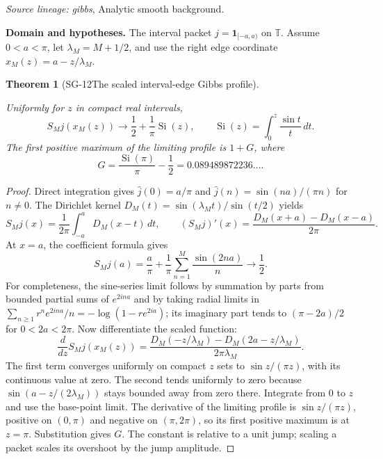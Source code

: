 \documentclass[11pt]{article}
\newtheorem{theorem}{Theorem}[section]
\theoremstyle{definition}\newtheorem{definition}[theorem]{Definition}
\theoremstyle{remark}\newtheorem{remark}[theorem]{Remark}
\begin{document}
\par{\small\color{Teal}\textit{Source lineage:} \textit{gibbs}, Analytic smooth background.}\par

\par{\small\textbf{Domain and hypotheses.} The interval packet $j=\mathbf1_{[-a,a)}$ on $\mathbb T$. Assume $0<a<\pi$, let $\lambda_M=M+1/2$, and use the right edge coordinate $x_M(z)=a-z/\lambda_M$.}\par
\begin{theorem}[SG-12\quad The scaled interval-edge Gibbs profile]\label{SG-12}

Uniformly for $z$ in compact real intervals,
\[
 S_Mj(x_M(z))\longrightarrow\frac12+\frac1\pi\operatorname{Si}(z),
 \qquad \operatorname{Si}(z)=\int_0^z\frac{\sin t}{t}\,dt.
\]
The first positive maximum of the limiting profile is $1+G$, where
\[
 G=\frac{\operatorname{Si}(\pi)}\pi-\frac12
   =0.089489872236\ldots.
\]

\end{theorem}
\begin{proof}

Direct integration gives $\widehat j(0)=a/\pi$ and
$\widehat j(n)=\sin(na)/(\pi n)$ for $n\ne0$. The Dirichlet kernel
$D_M(t)=\sin(\lambda_Mt)/\sin(t/2)$ yields
\[
 S_Mj(x)=\frac1{2\pi}\int_{-a}^{a}D_M(x-t)\,dt,
 \qquad (S_Mj)'(x)=\frac{D_M(x+a)-D_M(x-a)}{2\pi}.
\]
At $x=a$, the coefficient formula gives
\[
 S_Mj(a)=\frac a\pi+\frac1\pi\sum_{n=1}^M\frac{\sin(2na)}n
 \longrightarrow\frac12.
\]
For completeness, the sine-series limit follows by summation by parts from
bounded partial sums of $e^{2ina}$ and by taking radial limits in
$\sum_{n\ge1}r^ne^{2ina}/n=-\log(1-re^{2ia})$; its imaginary part tends to
$(\pi-2a)/2$ for $0<2a<2\pi$.
Now differentiate the scaled function:
\[
 \frac d{dz}S_Mj(x_M(z))=
 \frac{D_M(-z/\lambda_M)-D_M(2a-z/\lambda_M)}{2\pi\lambda_M}.
\]
The first term converges uniformly on compact $z$ sets to
$\sin z/(\pi z)$, with its continuous value at zero. The second tends
uniformly to zero because $\sin(a-z/(2\lambda_M))$ stays bounded away from
zero there. Integrate from $0$ to $z$ and use the base-point limit.
The derivative of the limiting profile is $\sin z/(\pi z)$, positive on
$(0,\pi)$ and negative on $(\pi,2\pi)$, so its first positive maximum is at
$z=\pi$. Substitution gives $G$. The constant is relative to a unit jump;
scaling a packet scales its overshoot by the jump amplitude.

\end{proof}
\end{document}

